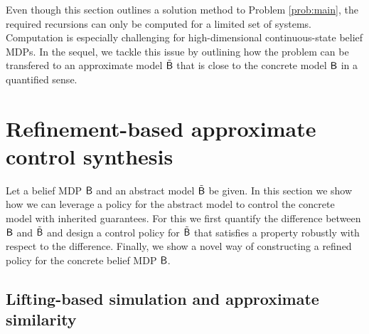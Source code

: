 \documentclass{ifacconf}
\begin{document}
Even though this section outlines a solution method to Problem \ref{prob:main}, the required recursions can only be computed for a limited set of systems.
Computation is especially challenging for high-dimensional continuous-state belief MDPs. In the sequel, we tackle this issue by outlining how the problem can be transfered to an approximate model $\tilde {\mathsf{B}}$ that is close to the concrete model $\mathsf{B}$ in a quantified sense.


\section{Refinement-based approximate control synthesis}
\label{sec:refinement}

Let a belief MDP $\mathsf{B}$ and an abstract model $\tilde {\mathsf{B}}$ be given. In this section we show how we can leverage a policy for the abstract model to control the concrete model with inherited guarantees. For this we first quantify the difference between $\mathsf{B}$ and $\tilde {\mathsf{B}}$ and design a control policy for $\tilde {\mathsf{B}}$ that satisfies a property robustly with respect to the difference. Finally, we show a novel way of constructing a refined policy for the concrete belief MDP $\mathsf{B}$.



\subsection{Lifting-based simulation and approximate similarity}
\end{document}
